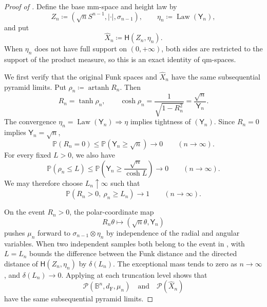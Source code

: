 \documentclass{amsart}
\numberwithin{equation}{section}
\theoremstyle{plain}
\theoremstyle{definition}
\theoremstyle{remark}
\newcommand{\B}{\mathbb B}
\newcommand{\Pyr}{\mathcal P}
\DeclareMathOperator{\artanh}{artanh}
\newcommand{\dF}{d_{\mathrm F}}
\begin{document}
\begin{proof}[Proof of ]
Define the base mm-space and height law by
\[
 Z_n\coloneqq(\sqrt nS^{n-1},|\cdot|,\sigma_{n-1}),
 \qquad
 \eta_n\coloneqq\operatorname{Law}(\mathsf Y_n),
\]
and put
\begin{equation}\label{eq:comparison-space}
 \widehat X_n\coloneqq\mathsf H(Z_n,\eta_n).
\end{equation}
When $\eta_n$ does not have full support on $(0,+\infty)$, both sides are restricted to the support of the product measure,
so this is an exact identity of qm-spaces.

We first verify that the original Funk spaces and $\widehat X_n$ have the same subsequential pyramid limits.  Put
$\rho_n\coloneqq\artanh R_n$.  Then
\[
 R_n=\tanh\rho_n,
 \qquad
 \cosh\rho_n=\frac1{\sqrt{1-R_n^2}}=\frac{\sqrt n}{\mathsf Y_n}.
\]
The convergence $\eta_n=\operatorname{Law}(\mathsf Y_n)\Rightarrow\eta$ implies tightness of $(\mathsf Y_n)$.  Since
$R_n=0$ implies $\mathsf Y_n=\sqrt n$,
\[
 \mathbb P(R_n=0)
 \le\mathbb P(\mathsf Y_n\ge\sqrt n)
 \longrightarrow0
 \qquad(n\to\infty).
\]
For every fixed $L>0$, we also have
\[
 \mathbb P(\rho_n\le L)
 \le\mathbb P\left(\mathsf Y_n\ge\frac{\sqrt n}{\cosh L}\right)
 \longrightarrow0
 \qquad(n\to\infty).
\]
We may therefore choose $L_n\uparrow\infty$ such that
\begin{equation}\label{eq:joint-radial-good-set}
 \mathbb P(R_n>0,\ \rho_n\ge L_n)
 \longrightarrow1
 \qquad(n\to\infty).
\end{equation}

On the event $R_n>0$, the polar-coordinate map
\[
 R_n\theta\longmapsto(\sqrt n\theta,\mathsf Y_n)
\]
pushes $\mu_n$ forward to $\sigma_{n-1}\otimes\eta_n$ by independence of the radial and angular variables.  When two
independent samples both belong to the event in ,
 with $L=L_n$ bounds the difference between the Funk distance and the
directed distance of $\mathsf H(Z_n,\eta_n)$ by $\delta(L_n)$.  The exceptional mass tends to zero as
$n\to\infty$, and $\delta(L_n)\to0$.  Applying  at each truncation level shows that
\begin{equation}\label{eq:joint-radial-same-subsequential-limits}
 \Pyr(\B^n,\dF,\mu_n)
 \quad\text{and}\quad
 \Pyr(\widehat X_n)
\end{equation}
have the same subsequential pyramid limits.


\end{proof}
\end{document}
